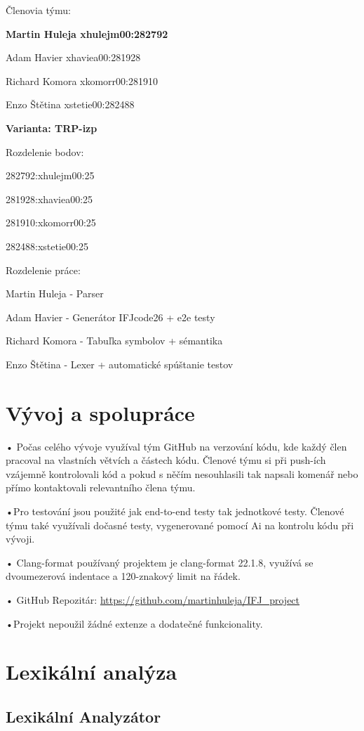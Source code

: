 \documentclass[a4paper, 11pt]{article}
\begin{document}
Členovia týmu:

\textbf{Martin Huleja xhulejm00:282792}

Adam Havier xhaviea00:281928

Richard Komora xkomorr00:281910

Enzo Štětina xstetie00:282488

\textbf{Varianta: TRP-izp}

Rozdelenie bodov:

282792:xhulejm00:25

281928:xhaviea00:25

281910:xkomorr00:25

282488:xstetie00:25


Rozdelenie práce:

Martin Huleja - Parser

Adam Havier - Generátor IFJcode26 + e2e testy

Richard Komora - Tabuľka symbolov + sémantika

Enzo Štětina - Lexer + automatické spúštanie testov

\section{Vývoj a spolupráce}

• Počas celého vývoje využíval tým GitHub na verzování kódu, kde každý člen pracoval na vlastních větvích a částech kódu. Členové týmu si při push-ích vzájemně kontrolovali kód a pokud s něčím nesouhlasili tak napsali komenář nebo přímo kontaktovali relevantního člena týmu.

•Pro testování jsou použité jak end-to-end testy tak jednotkové testy. Členové týmu také využívali dočasné testy, vygenerované pomocí Ai na kontrolu kódu při vývoji.

• Clang-format používaný projektem je clang-format 22.1.8, využívá se dvoumezerová indentace a 120-znakový limit na řádek.

• GitHub Repozitár: \href{https://github.com/martinhuleja/IFJ\_project}{https://github.com/martinhuleja/IFJ\_project}

•Projekt nepoužil žádné extenze a dodatečné funkcionality.

\section{Lexikální analýza}

\subsection{Lexikální Analyzátor}
\end{document}
